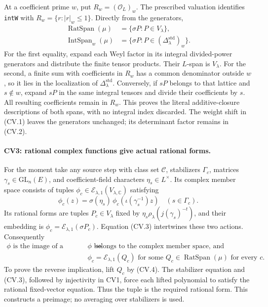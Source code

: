 \documentclass[11pt,a4paper]{article}
\numberwithin{equation}{section}
\theoremstyle{remark}\newtheorem{remark}[theorem]{Remark}
\begin{document}
At a coefficient prime \(w\), put
\(R_w=(\mathcal O_L)_w\).
The prescribed valuation identifies \texttt{intW} with
\(R_w=\{r:|r|_w\le1\}\). Directly from the generators,
\[
 \begin{split}
 \operatorname{RatSpan}(\mu)
       &=\{\sigma P:P\in V_\lambda\},\\
 \operatorname{IntSpan}_w(\mu)
       &=\{\sigma P:P\in
                      (\Delta_\lambda^{\mathrm{std}})_w\}.
 \end{split}                                                   \tag{CV.4}
\]
For the first equality, expand each Weyl factor in its integral
divided-power generators and distribute the finite tensor
products. Their \(L\)-span is \(V_\lambda\).
For the second, a finite sum with coefficients in \(R_w\)
has a common denominator outside \(w\), so it lies in the
localization of \(\Delta_\lambda^{\mathrm{std}}\).
Conversely, if \(sP\) belongs to that lattice and \(s\notin w\),
expand \(sP\) in the same integral tensors and divide their
coefficients by \(s\). All resulting coefficients remain in
\(R_w\). This proves the literal additive-closure descriptions
of both spans, with no integral index discarded.
The weight shift in (CV.1) leaves the generators unchanged;
its determinant factor remains in (CV.2).

\paragraph{CV3: rational complex functions give actual rational forms.}
For the moment take any source step with class set
\(\mathcal C\), stabilizers \(\Gamma_c\), matrices
\(\gamma_s\in\mathrm{GL}_n(E)\), and coefficient-field
characters \(\eta_s\in L^\times\). Its complex member space
consists of tuples \(\phi_c\in
\mathcal E_{\lambda,1}(V_{\lambda,\mathbb C})\) satisfying
\[
 \phi_c(z)=\sigma(\eta_s)\,
                 \phi_c(\iota(\gamma_s^{-1})z)
                       \quad(s\in\Gamma_c).                  \tag{CV.5}
\]
Its rational forms are tuples \(P_c\in V_\lambda\) fixed by
\(\eta_s\rho_\lambda(j(\gamma_s)^{-t})\), and their
embedding is \(\phi_c=\mathcal E_{\lambda,1}(\sigma P_c)\).
Equation (CV.3) intertwines these two actions. Consequently
\[
 \begin{split}
 \phi\text{ is the image of a rational form}
 \quad\Longleftrightarrow\quad&
 \phi\text{ belongs to the complex member space, and}\\[-2pt]
 &\phi_c=\mathcal E_{\lambda,1}(Q_c)
     \text{ for some }Q_c\in\operatorname{RatSpan}(\mu)
     \text{ for every }c.
 \end{split}                                                   \tag{CV.6}
\]
To prove the reverse implication, lift \(Q_c\) by (CV.4).
The stabilizer equation and (CV.3), followed by injectivity
in CV1, force each lifted polynomial to satisfy the rational
fixed-vector equation. Thus the tuple is the required
rational form. This constructs a preimage; no averaging
over stabilizers is used.
\end{document}
